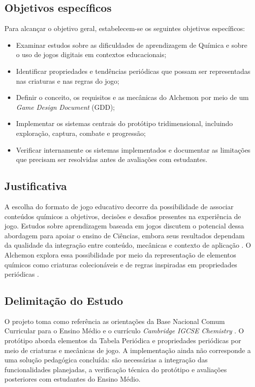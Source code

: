 \subsection{Objetivos específicos}
Para alcançar o objetivo geral, estabelecem-se os seguintes objetivos específicos:
\begin{itemize}
    \item Examinar estudos sobre as dificuldades de aprendizagem de Química e sobre o uso de jogos digitais em contextos educacionais;
    \item Identificar propriedades e tendências periódicas que possam ser representadas nas criaturas e nas regras do jogo;
    \item Definir o conceito, os requisitos e as mecânicas do Alchemon por meio de um \textit{Game Design Document} (GDD);
    \item Implementar os sistemas centrais do protótipo tridimensional, incluindo exploração, captura, combate e progressão;
    \item Verificar internamente os sistemas implementados e documentar as limitações que precisam ser resolvidas antes de avaliações com estudantes.
\end{itemize}

\subsection{Justificativa}
A escolha do formato de jogo educativo decorre da possibilidade de associar conteúdos químicos a objetivos, decisões e desafios presentes na experiência de jogo. Estudos sobre aprendizagem baseada em jogos discutem o potencial dessa abordagem para apoiar o ensino de Ciências, embora seus resultados dependam da qualidade da integração entre conteúdo, mecânicas e contexto de aplicação \cite{Plass2020,Soriano-Sanchez2026}. O Alchemon explora essa possibilidade por meio da representação de elementos químicos como criaturas colecionáveis e de regras inspiradas em propriedades periódicas \cite{Bellotti2010}.

\subsection{Delimitação do Estudo}
O projeto toma como referência as orientações da Base Nacional Comum Curricular para o Ensino Médio \cite{BNCC26} e o currículo \textit{Cambridge IGCSE Chemistry} \cite{igcse_chemistry_2023}. O protótipo aborda elementos da Tabela Periódica e propriedades periódicas por meio de criaturas e mecânicas de jogo. A implementação ainda não corresponde a uma solução pedagógica concluída: são necessárias a integração das funcionalidades planejadas, a verificação técnica do protótipo e avaliações posteriores com estudantes do Ensino Médio.

